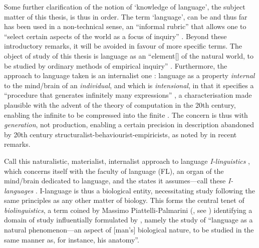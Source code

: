 Some further clarification of the notion of `knowledge of language', the subject matter of this thesis, is thus in order. The term `language', can be and thus far has been used in a non-technical sense, an ``informal rubric'' that allows one to ``select certain aspects of the world as a focus of inquiry'' \parencite[1]{ChomskyN_1995c}. Beyond these introductory remarks, it will be avoided in favour of more specific terms. The object of study of this thesis is language as an ``element[] of the natural world, to be studied by ordinary methods of empirical inquiry'' \parencite[1]{ChomskyN_1995c}. Furthermore, the approach to language taken is an internalist one \parencite{ChomskyN_2003}: language as a property \textit{internal} to the mind/brain of an \textit{individual}, and which is \textit{intensional}, in that it specifies a ``procedure that generates infinitely many expressions'' \parencite[263]{ChomskyN_2003}, a characterisation made plausible with the advent of the theory of computation in the 20th century, enabling the infinite to be compressed into the finite \parencite{TuringAM_1936}. The concern is thus with \textit{generation}, not production, enabling a certain precision in description abandoned by 20th century structuralist-behaviourist-empiricists, as noted by \textcite{ChomskyN_2021c} in recent remarks.

Call this naturalistic, materialist, internalist approach to language \textit{I-linguistics} \parencite[263]{ChomskyN_2003}, which concerns itself with the faculty of language (FL), an organ of the mind/brain dedicated to language, and the states it assumes---call these \textit{I-languages} \parencite[21]{ChomskyN_1986a}. I-language is thus a biological entity, necessitating study following the same principles as any other matter of biology. This forms the central tenet of \textit{biolinguistics}, a term coined by Massimo Piattelli-Palmarini (, see ) identifying a domain of study influentially formulated by \textcite[vii]{LennebergEH_1967}, namely the study of ``language as a natural phenomenon---an aspect of [man's] biological nature, to be studied in the same manner as, for instance, his anatomy''.

